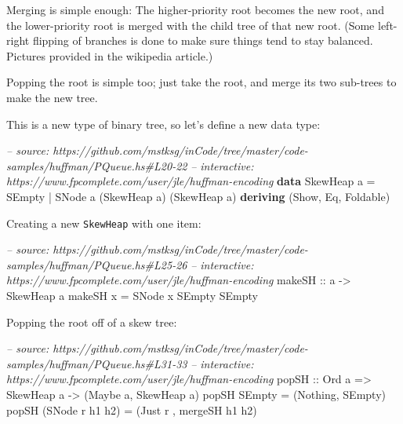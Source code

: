 \documentclass[]{article}
\newenvironment{Shaded}{}{}
\newcommand{\KeywordTok}[1]{\textcolor[rgb]{0.00,0.44,0.13}{\textbf{{#1}}}}
\newcommand{\DataTypeTok}[1]{\textcolor[rgb]{0.56,0.13,0.00}{{#1}}}
\newcommand{\CommentTok}[1]{\textcolor[rgb]{0.38,0.63,0.69}{\textit{{#1}}}}
\newcommand{\OtherTok}[1]{\textcolor[rgb]{0.00,0.44,0.13}{{#1}}}
\newcommand{\FunctionTok}[1]{\textcolor[rgb]{0.02,0.16,0.49}{{#1}}}
\newcommand{\NormalTok}[1]{{#1}}
\begin{document}
Merging is simple enough: The higher-priority root becomes the new root,
and the lower-priority root is merged with the child tree of that new
root. (Some left-right flipping of branches is done to make sure things
tend to stay balanced. Pictures provided in the wikipedia article.)

Popping the root is simple too; just take the root, and merge its two
sub-trees to make the new tree.

This is a new type of binary tree, so let's define a new data type:

\begin{Shaded}
\begin{Highlighting}[]
\CommentTok{-- source: https://github.com/mstksg/inCode/tree/master/code-samples/huffman/PQueue.hs#L20-22}
\CommentTok{-- interactive: https://www.fpcomplete.com/user/jle/huffman-encoding}
\KeywordTok{data} \DataTypeTok{SkewHeap} \NormalTok{a }\FunctionTok{=} \DataTypeTok{SEmpty}
                \FunctionTok{|} \DataTypeTok{SNode} \NormalTok{a (}\DataTypeTok{SkewHeap} \NormalTok{a) (}\DataTypeTok{SkewHeap} \NormalTok{a)}
                \KeywordTok{deriving} \NormalTok{(}\DataTypeTok{Show}\NormalTok{, }\DataTypeTok{Eq}\NormalTok{, }\DataTypeTok{Foldable}\NormalTok{)}
\end{Highlighting}
\end{Shaded}

Creating a new \texttt{SkewHeap} with one item:

\begin{Shaded}
\begin{Highlighting}[]
\CommentTok{-- source: https://github.com/mstksg/inCode/tree/master/code-samples/huffman/PQueue.hs#L25-26}
\CommentTok{-- interactive: https://www.fpcomplete.com/user/jle/huffman-encoding}
\OtherTok{makeSH ::} \NormalTok{a }\OtherTok{->} \DataTypeTok{SkewHeap} \NormalTok{a}
\NormalTok{makeSH x }\FunctionTok{=} \DataTypeTok{SNode} \NormalTok{x }\DataTypeTok{SEmpty} \DataTypeTok{SEmpty}
\end{Highlighting}
\end{Shaded}

Popping the root off of a skew tree:

\begin{Shaded}
\begin{Highlighting}[]
\CommentTok{-- source: https://github.com/mstksg/inCode/tree/master/code-samples/huffman/PQueue.hs#L31-33}
\CommentTok{-- interactive: https://www.fpcomplete.com/user/jle/huffman-encoding}
\OtherTok{popSH ::} \DataTypeTok{Ord} \NormalTok{a }\OtherTok{=>} \DataTypeTok{SkewHeap} \NormalTok{a }\OtherTok{->} \NormalTok{(}\DataTypeTok{Maybe} \NormalTok{a, }\DataTypeTok{SkewHeap} \NormalTok{a)}
\NormalTok{popSH }\DataTypeTok{SEmpty}          \FunctionTok{=} \NormalTok{(}\DataTypeTok{Nothing}\NormalTok{, }\DataTypeTok{SEmpty}\NormalTok{)}
\NormalTok{popSH (}\DataTypeTok{SNode} \NormalTok{r h1 h2) }\FunctionTok{=} \NormalTok{(}\DataTypeTok{Just} \NormalTok{r , mergeSH h1 h2)}
\end{Highlighting}
\end{Shaded}
\end{document}
